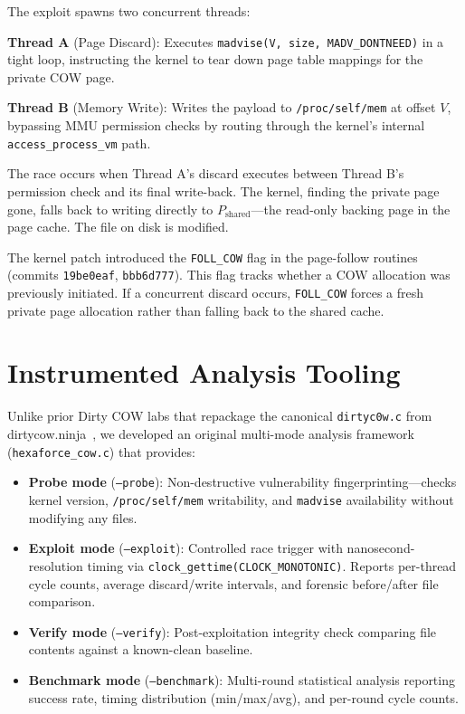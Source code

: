 \documentclass[conference]{IEEEtran}
\begin{document}
The exploit spawns two concurrent threads:

\textbf{Thread A} (Page Discard): Executes \texttt{madvise(V, size, MADV\_DONTNEED)} in a tight loop, instructing the kernel to tear down page table mappings for the private COW page.

\textbf{Thread B} (Memory Write): Writes the payload to \texttt{/proc/self/mem} at offset $V$, bypassing MMU permission checks by routing through the kernel's internal \texttt{access\_process\_vm} path.

The race occurs when Thread A's discard executes between Thread B's permission check and its final write-back. The kernel, finding the private page gone, falls back to writing directly to $P_{\text{shared}}$---the read-only backing page in the page cache. The file on disk is modified.

The kernel patch introduced the \texttt{FOLL\_COW} flag in the page-follow routines (commits \texttt{19be0eaf}, \texttt{bbb6d777}). This flag tracks whether a COW allocation was previously initiated. If a concurrent discard occurs, \texttt{FOLL\_COW} forces a fresh private page allocation rather than falling back to the shared cache.

\section{Instrumented Analysis Tooling}
Unlike prior Dirty COW labs that repackage the canonical \texttt{dirtyc0w.c} from dirtycow.ninja~\cite{b1}, we developed an original multi-mode analysis framework (\texttt{hexaforce\_cow.c}) that provides:

\begin{itemize}
    \item \textbf{Probe mode} (\texttt{--probe}): Non-destructive vulnerability fingerprinting---checks kernel version, \texttt{/proc/self/mem} writability, and \texttt{madvise} availability without modifying any files.
    \item \textbf{Exploit mode} (\texttt{--exploit}): Controlled race trigger with nanosecond-resolution timing via \texttt{clock\_gettime(CLOCK\_MONOTONIC)}. Reports per-thread cycle counts, average discard/write intervals, and forensic before/after file comparison.
    \item \textbf{Verify mode} (\texttt{--verify}): Post-exploitation integrity check comparing file contents against a known-clean baseline.
    \item \textbf{Benchmark mode} (\texttt{--benchmark}): Multi-round statistical analysis reporting success rate, timing distribution (min/max/avg), and per-round cycle counts.
\end{itemize}
\end{document}
